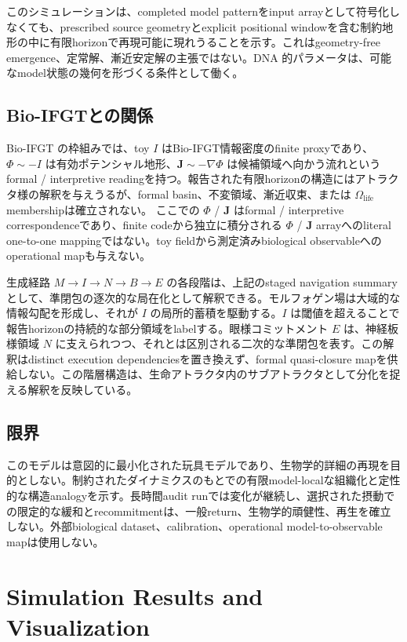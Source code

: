 \documentclass[11pt]{ltjsarticle}
\newcommand{\I}{I}
\newcommand{\J}{\mathbf{J}}
\newcommand{\PhiI}{\Phi}
\begin{document}
このシミュレーションは、completed model patternをinput arrayとして符号化しなくても、prescribed source geometryとexplicit positional windowを含む制約地形の中に有限horizonで再現可能に現れうることを示す。これはgeometry-free emergence、定常解、漸近安定解の主張ではない。DNA 的パラメータは、可能なmodel状態の幾何を形づくる条件として働く。

\subsection{Bio-IFGTとの関係}

Bio-IFGT の枠組みでは、toy \(\I\) はBio-IFGT情報密度のfinite proxyであり、\(\PhiI\sim-\I\) は有効ポテンシャル地形、\(\J\sim-\nabla\PhiI\) は候補領域へ向かう流れというformal / interpretive readingを持つ。報告された有限horizonの構造にはアトラクタ様の解釈を与えうるが、formal basin、不変領域、漸近収束、または \(\Omega_{\mathrm{life}}\) membershipは確立されない。
ここでの \(\PhiI\) / \(\J\) はformal / interpretive correspondenceであり、finite codeから独立に積分される \(\PhiI\) / \(\J\) arrayへのliteral one-to-one mappingではない。toy fieldから測定済みbiological observableへのoperational mapも与えない。

生成経路 \(M\rightarrow \I\rightarrow N\rightarrow B\rightarrow E\) の各段階は、上記のstaged navigation summaryとして、準閉包の逐次的な局在化として解釈できる。モルフォゲン場は大域的な情報勾配を形成し、それが \(\I\) の局所的蓄積を駆動する。\(\I\) は閾値を超えることで報告horizonの持続的な部分領域をlabelする。眼様コミットメント \(E\) は、神経板様領域 \(N\) に支えられつつ、それとは区別される二次的な準閉包を表す。この解釈はdistinct execution dependenciesを置き換えず、formal quasi-closure mapを供給しない。この階層構造は、生命アトラクタ内のサブアトラクタとして分化を捉える解釈を反映している。

\subsection{限界}

このモデルは意図的に最小化された玩具モデルであり、生物学的詳細の再現を目的としない。制約されたダイナミクスのもとでの有限model-localな組織化と定性的な構造analogyを示す。長時間audit runでは変化が継続し、選択された摂動での限定的な緩和とrecommitmentは、一般return、生物学的頑健性、再生を確立しない。外部biological dataset、calibration、operational model-to-observable mapは使用しない。

\section{Simulation Results and Visualization}
\end{document}
